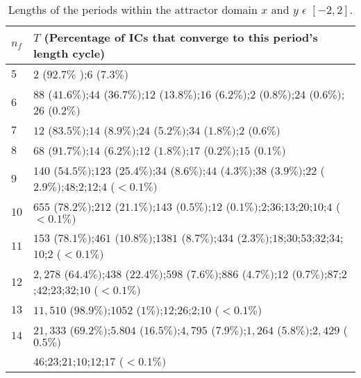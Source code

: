 \begin{table*}[!t]
\renewcommand{\arraystretch}{1.3}
\caption{Lengths of the periods within the attractor domain $x$ and $y$ $\epsilon$  $[-2,2]$.}
\label{tabla}
\centering
\fontsize{9}{9}\selectfont
\begin{tabular}{l  l  }
\hline
$n_f$ & $T$ {\scriptsize(Percentage of ICs that converge to this period's length cycle)}  \\
\hline
\hline
$5$ & $2$ {\scriptsize($92.7\%$ )};$6$  {\scriptsize($7.3\% )$}\\
$6$ & $88$ {\scriptsize($41.6 \% )$};$44$ {\scriptsize($36.7 \% )$};$12$ {\scriptsize($13.8\% )$};$16$ {\scriptsize($6.2 \% )$};$2$ {\scriptsize($0.8 \% )$};$24$ {\scriptsize($0.6 \% )$};$26$ {\scriptsize($0.2 \%)$}\\
$7$ &  $12$ {\scriptsize($83.5 \% )$};$14$ {\scriptsize($8.9\% )$};$24$ {\scriptsize($5.2\% )$};$34$ {\scriptsize($1.8 \% )$};$2$ {\scriptsize($0.6\% )$} \\
$8$ & $68$ {\scriptsize($91.7\%)$};$14$ {\scriptsize($6.2\%)$};$12$ {\scriptsize($1.8 \%)$};$17$ {\scriptsize($0.2\% )$};$15$ {\scriptsize($0.1 \%)$}\\ 
$9$ & $140$ {\scriptsize($54.5 \%)$};$123$ {\scriptsize($25.4 \%)$};$34$ {\scriptsize($8.6\%)$};$44$ {\scriptsize($4.3 \%)$};$38$ {\scriptsize($3.9 \%)$};$22$ {\scriptsize($2.9 \%)$};$48$;$2$;$12$;$4$ {\scriptsize($<0.1\%)$}\\
$10$ & $655$ {\scriptsize($78.2\%)$};$212$ {\scriptsize($21.1\%)$};$143$ {\scriptsize($0.5\%)$};$12$ {\scriptsize($0.1\%)$};$2$;$36$;$13$;$20$;$10$;$4$ {\scriptsize($<0.1\%)$}\\
$11$ & $153$ {\scriptsize($78.1\%)$};$461$ {\scriptsize($10.8\% )$};$1381$ {\scriptsize($8.7\%)$};$434$ {\scriptsize($2.3\%)$};$18$;$30$;$53$;$32$;$34$;$10$;$2$ {\scriptsize($<0.1\% )$}\\
$12$ & $2,278$ {\scriptsize($64.4\%)$};$438$ {\scriptsize($22.4\% )$};$598$ {\scriptsize($7.6\% )$};$886$ {\scriptsize($4.7 \%)$};$12$ {\scriptsize($0.7\%)$};$87$;$2$;$42$;$23$;$32$;$10$ {\scriptsize($<0.1\% )$}\\
$13$ & $11,510$ {\scriptsize($ 98.9\%)$};$1052$ {\scriptsize($1 \%)$};$12$;$26$;$2$;$10$ {\scriptsize($<0.1\% )$}\\
$14$ & $21,333$ {\scriptsize($69.2\% )$};$5.804$ {\scriptsize($16.5\%  )$};$4,795$ {\scriptsize($7.9\%  )$};$1,264$ {\scriptsize($5.8 \% )$};$2,429$ {\scriptsize($0.5\% )$}\\ 
& $46$;$23$;$21$;$10$;$12$;$17$ {\scriptsize($<0.1\%  )$}\\ 

\end{tabular}
\end{table*}
